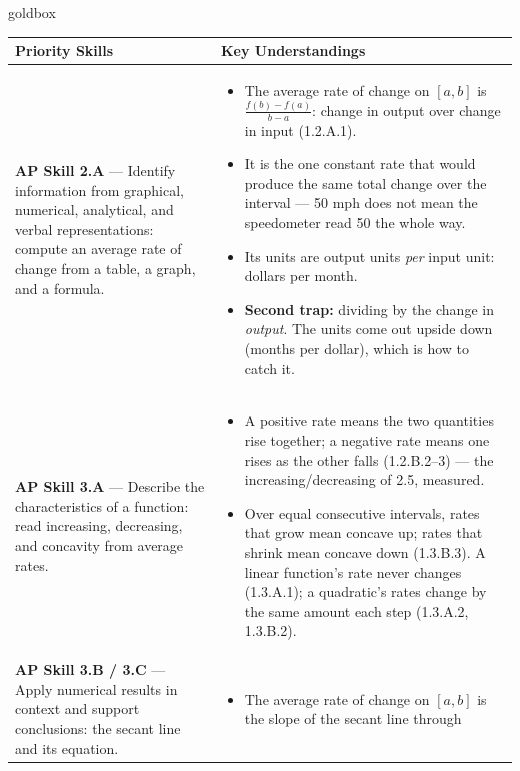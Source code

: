 \documentclass[10pt]{article}
\begin{document}
\renewcommand{\arraystretch}{1.6}
\begin{skillbox}{goldbox}
\begin{tabularx}{\linewidth}{@{}X X@{}}
\textbf{Priority Skills} &
\textbf{Key Understandings} \\
\midrule
\textbf{AP Skill 2.A} --- Identify information from graphical, numerical, analytical, and
verbal representations: compute an average rate of change from a table, a graph, and a
formula. &
\begin{itemize}[leftmargin=1.2em,itemsep=2pt,topsep=0pt]
  \item The average rate of change on $[a, b]$ is $\frac{f(b) - f(a)}{b - a}$: change in
        output over change in input (1.2.A.1).
  \item It is the one constant rate that would produce the same total change over the
        interval --- 50 mph does not mean the speedometer read 50 the whole way.
  \item Its units are output units \emph{per} input unit: dollars per month.
  \item \textbf{Second trap:} dividing by the change in \emph{output}. The units come out
        upside down (months per dollar), which is how to catch it.
\end{itemize} \\
\textbf{AP Skill 3.A} --- Describe the characteristics of a function: read increasing,
decreasing, and concavity from average rates. &
\begin{itemize}[leftmargin=1.2em,itemsep=2pt,topsep=0pt]
  \item A positive rate means the two quantities rise together; a negative rate means one
        rises as the other falls (1.2.B.2--3) --- the increasing/decreasing of 2.5, measured.
  \item Over equal consecutive intervals, rates that grow mean concave up; rates that shrink
        mean concave down (1.3.B.3). A linear function's rate never changes (1.3.A.1); a
        quadratic's rates change by the same amount each step (1.3.A.2, 1.3.B.2).
\end{itemize} \\
\textbf{AP Skill 3.B / 3.C} --- Apply numerical results in context and support conclusions: the
secant line and its equation. &
\begin{itemize}[leftmargin=1.2em,itemsep=2pt,topsep=0pt]
  \item The average rate of change on $[a, b]$ is the slope of the secant line through

\end{itemize}
\end{tabularx}
\end{skillbox}
\end{document}
